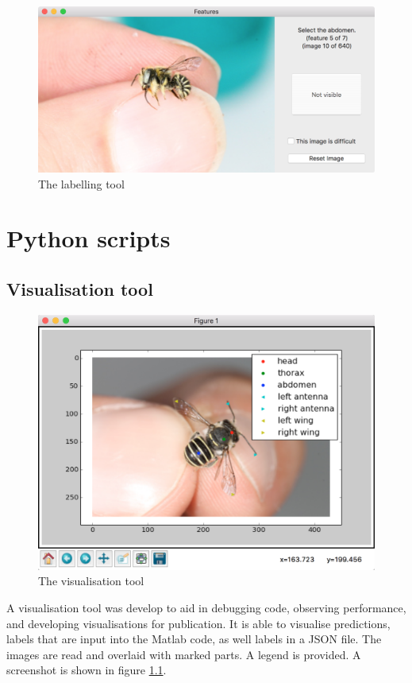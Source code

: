 \documentclass[11pt, oneside]{report}
\begin{document}
    \begin{figure}[h]
        \centering
        \includegraphics[width=\textwidth]{features_tool.png}\hfill
        \caption{The labelling tool}
        \label{fig:Labelling_screenshot}
    \end{figure}

\chapter{Python scripts}
    \section{Visualisation tool}
        \begin{figure}[h]
            \centering
            \includegraphics[width=\textwidth]{visualisation_tool.png}\hfill
            \caption{The visualisation tool}
            \label{fig:Visualisation_screenshot}
        \end{figure}
        A visualisation tool was develop to aid in debugging code, observing performance, and developing visualisations for publication. It is able to visualise predictions, labels that are input into the Matlab code, as well labels in a JSON file. The images are read and overlaid with marked parts. A legend is provided. A screenshot is shown in figure \ref{fig:Visualisation_screenshot}.
\end{document}

